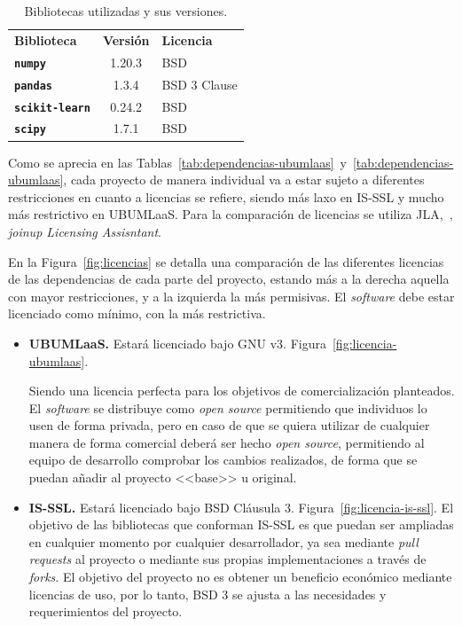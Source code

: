 \begin{table}[]
\centering
\begin{tabular}{lcl}
	\toprule
	\textbf{Biblioteca} & \textbf{Versión} & \textbf{Licencia}\\ \rowcolor[HTML]{EFEFEF} 
	\midrule
	\rowcolor[HTML]{EFEFEF} 
	\textbf{\texttt{numpy}}    & 1.20.3 &  BSD \\ \rowcolor[HTML]{EFEFEF} 
	\textbf{\texttt{pandas}}    & 1.3.4  & BSD 3 Clause  \\  
	\textbf{\texttt{scikit-learn}}    & 0.24.2 & BSD  \\ \rowcolor[HTML]{EFEFEF} 
	\textbf{\texttt{scipy}}    & 1.7.1  & BSD   \\ 
	\bottomrule
\end{tabular}
\caption{Bibliotecas utilizadas y sus versiones.}\label{tab:dependencias-is-ssl}
\end{table}

Como se aprecia en las Tablas~\ref{tab:dependencias-ubumlaas}~y~\ref{tab:dependencias-ubumlaas}, cada proyecto de manera individual va a estar sujeto a diferentes restricciones en cuanto a licencias se refiere, siendo más laxo en IS-SSL y mucho más restrictivo en UBUMLaaS. Para la comparación de licencias se utiliza JLA,~\cite{JLA}, \textit{joinup Licensing Assisntant}.


En la Figura~\ref{fig:licencias} se detalla una comparación de las diferentes licencias de las dependencias de cada parte del proyecto, estando más a la derecha aquella con mayor restricciones, y a la izquierda la más permisivas. El \textit{software} debe estar licenciado como mínimo, con la más restrictiva.

\begin{itemize}
\item \textbf{UBUMLaaS.} Estará licenciado bajo GNU v3.  Figura~\ref{fig:licencia-ubumlaas}. 

Siendo una licencia perfecta para los objetivos de comercialización planteados. El \textit{software} se distribuye como \textit{open source} permitiendo que individuos lo usen de forma privada, pero en caso de que se quiera utilizar de cualquier manera de forma comercial deberá ser hecho \textit{open source}, permitiendo al equipo de desarrollo comprobar los cambios realizados, de forma que se puedan añadir al proyecto <<base>> u original.

\item \textbf{IS-SSL.} Estará licenciado bajo BSD Cláusula 3.  Figura~\ref{fig:licencia-is-ssl}.  El objetivo de las bibliotecas que conforman IS-SSL es que puedan ser ampliadas en cualquier momento por cualquier desarrollador, ya sea mediante \textit{pull requests} al proyecto o mediante sus propias implementaciones a través de \textit{forks}.  El objetivo del proyecto no es obtener un beneficio económico mediante licencias de uso, por lo tanto, BSD 3 se ajusta a las necesidades y requerimientos del proyecto.
\end{itemize}

